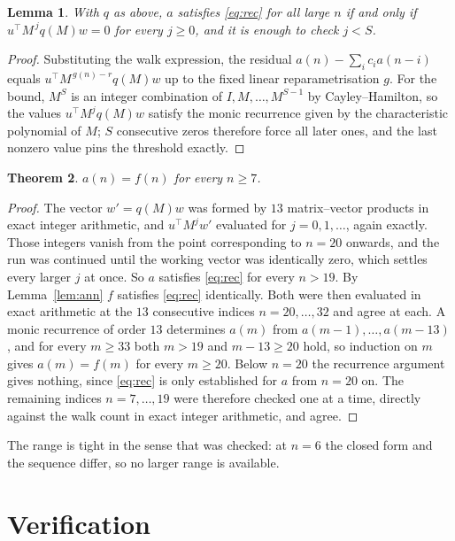 \documentclass[11pt,a4paper]{article}
\theoremstyle{plain}
\newtheorem{theorem}{Theorem}
\newtheorem{lemma}[theorem]{Lemma}
\theoremstyle{definition}
\begin{document}
\begin{lemma}\label{lem:crit}
With $q$ as above, $a$ satisfies \eqref{eq:rec} for all large $n$ if and only if
$u^{\!\top}M^{\,j}q(M)w=0$ for every $j\ge0$, and it is enough to check $j<S$.
\end{lemma}

\begin{proof}
Substituting the walk expression, the residual $a(n)-\sum_ic_ia(n-i)$ equals
$u^{\!\top}M^{\,g(n)-r}q(M)w$ up to the fixed linear reparametrisation $g$. For the bound,
$M^{S}$ is an integer combination of $I,M,\dots,M^{S-1}$ by Cayley--Hamilton, so the values
$u^{\!\top}M^{j}q(M)w$ satisfy the monic recurrence given by the characteristic polynomial of
$M$; $S$ consecutive zeros therefore force all later ones, and the last nonzero value pins the
threshold exactly.
\end{proof}

\begin{theorem}
$a(n)=f(n)$ for every $n\ge7$.
\end{theorem}

\begin{proof}
The vector $w'=q(M)w$ was formed by $13$ matrix--vector products in exact integer
arithmetic, and $u^{\!\top}M^{j}w'$ evaluated for $j=0,1,\dots$, again exactly. Those integers
vanish from the point corresponding to $n=20$ onwards, and the run was continued until the
working vector was identically zero, which settles every larger $j$ at once. So $a$ satisfies
\eqref{eq:rec} for every $n>19$. By Lemma~\ref{lem:ann} $f$ satisfies \eqref{eq:rec}
identically. Both were then evaluated in exact arithmetic at the $13$ consecutive indices
$n=20,\dots,32$ and agree at each. A monic recurrence of order $13$
determines $a(m)$ from $a(m-1),\dots,a(m-13)$, and for every $m\ge33$ both
$m>19$ and $m-13\ge20$ hold, so induction on $m$ gives $a(m)=f(m)$ for every
$m\ge20$.
Below $n=20$ the recurrence argument gives nothing, since \eqref{eq:rec} is only
established for $a$ from $n=20$ on. The remaining indices $n=7,\dots,19$ were
therefore checked one at a time, directly against the walk count in exact integer arithmetic,
and agree.
\end{proof}

The range is tight in the sense that was checked: at $n=6$ the closed form and the sequence differ, so no larger range is available.

\section{Verification}
\end{document}
